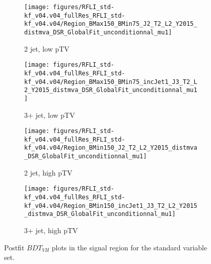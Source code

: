 \begin{figure}[!htbp]\captionsetup{justification=centering}
    \centering
\begin{subfigure}[t]{0.45000\textwidth}\centering\texttt{[image: figures/RFLI\_std-kf\_v04.v04\_fullRes\_RFLI\_std-kf\_v04.v04/Region\_BMax150\_BMin75\_J2\_T2\_L2\_Y2015\_distmva\_DSR\_GlobalFit\_unconditionnal\_mu1]}\caption{2 jet, low pTV}\end{subfigure}
\begin{subfigure}[t]{0.45000\textwidth}\centering\texttt{[image: figures/RFLI\_std-kf\_v04.v04\_fullRes\_RFLI\_std-kf\_v04.v04/Region\_BMax150\_BMin75\_incJet1\_J3\_T2\_L2\_Y2015\_distmva\_DSR\_GlobalFit\_unconditionnal\_mu1]}\caption{3+ jet, low pTV}\end{subfigure}
\begin{subfigure}[t]{0.45000\textwidth}\centering\texttt{[image: figures/RFLI\_std-kf\_v04.v04\_fullRes\_RFLI\_std-kf\_v04.v04/Region\_BMin150\_J2\_T2\_L2\_Y2015\_distmva\_DSR\_GlobalFit\_unconditionnal\_mu1]}\caption{2 jet, high pTV}\end{subfigure}
\begin{subfigure}[t]{0.45000\textwidth}\centering\texttt{[image: figures/RFLI\_std-kf\_v04.v04\_fullRes\_RFLI\_std-kf\_v04.v04/Region\_BMin150\_incJet1\_J3\_T2\_L2\_Y2015\_distmva\_DSR\_GlobalFit\_unconditionnal\_mu1]}\caption{3+ jet, high pTV}\end{subfigure}
  \caption{Postfit $BDT_{VH}$ plots in the signal region for the standard variable set.}
  \label{fig:stdPostfitmva}
\end{figure}

